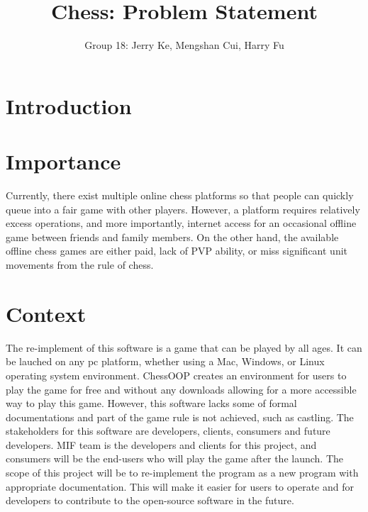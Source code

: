 \documentclass[12pt,letterpaper]{article}
\title{Chess: Problem Statement}
\author{Group 18: Jerry Ke, Mengshan Cui, Harry Fu}
\date{}
\begin{document}
\maketitle
\section{Introduction}

\section{Importance}
Currently, there exist multiple online chess platforms so that people can quickly queue into a fair game with other players. However, a platform requires relatively excess operations, and more importantly, internet access for an occasional offline game between friends and family members. On the other hand, the available offline chess games are either paid, lack of PVP ability, or miss significant unit movements from the rule of chess. 

\section{Context}
The re-implement of this software is a game that can be played by all ages. It can be lauched on any pc platform, whether using a Mac, Windows, or Linux operating system environment. ChessOOP creates an environment for users to play the game for free and without any downloads allowing for a more accessible way to play this game. However, this software lacks some of formal documentations and part of the game rule is not achieved, such as castling. The stakeholders for this software are developers, clients, consumers and future developers. MIF team is the developers and clients for this project, and consumers will be the end-users who will play the game after the launch. The scope of this project will be to re-implement the program as a new program with appropriate documentation. This will make it easier for users to operate and for developers to contribute to the open-source software in the future.

\end{document}
